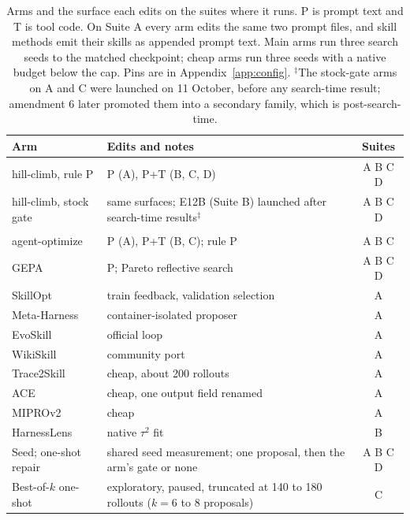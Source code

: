 \begin{table}[t]
\caption{Arms and the surface each edits on the suites where it runs. P is prompt text and T is tool code. On Suite A every arm edits the same two prompt files, and skill methods emit their skills as appended prompt text. Main arms run three search seeds to the matched checkpoint; cheap arms run three seeds with a native budget below the cap. Pins are in Appendix~\ref{app:config}. $^\ddagger$The stock-gate arms on A and C were launched on 11 October, before any search-time result; amendment 6 later promoted them into a secondary family, which is post-search-time.}
\label{tab:v2:arms}
\centering\small
\begin{tabularx}{\columnwidth}{@{}lXc@{}}
\toprule
Arm & Edits and notes & Suites \\
\midrule
\capevolve{} hill-climb, rule P & P (A), P+T (B, C, D) & A B C D \\
\capevolve{} hill-climb, stock gate & same surfaces; E12B (Suite B) launched after search-time results$^\ddagger$ & A B C D \\ \\
\capevolve{} agent-optimize & P (A), P+T (B, C); rule P & A B C \\
GEPA \citep{gepa} & P; Pareto reflective search & A B C D \\
SkillOpt \citep{skillopt} & train feedback, validation selection & A \\
Meta-Harness \citep{meta-harness} & container-isolated proposer & A \\
EvoSkill \citep{evoskill} & official loop & A \\
WikiSkill \citep{wikiskill} & community port & A \\
Trace2Skill \citep{trace2skill} & cheap, about 200 rollouts & A \\
ACE \citep{ace} & cheap, one output field renamed & A \\
MIPROv2 \citep{miprov2-dspy} & cheap & A \\
HarnessLens \citep{xu2026harnesslens} & native $\tau^2$ fit & B \\
Seed; one-shot repair & shared seed measurement; one proposal, then the arm's gate or none & A B C D \\
Best-of-$k$ one-shot & exploratory, paused, truncated at 140 to 180 rollouts ($k=6$ to 8 proposals) & C \\
\bottomrule
\end{tabularx}
\end{table}

